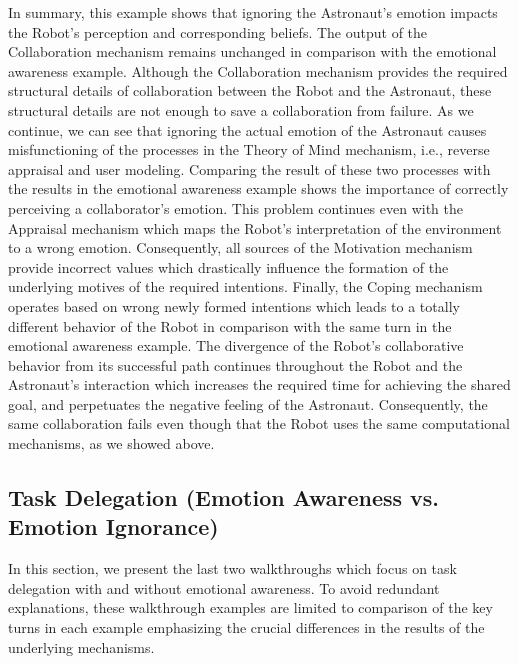 In summary, this example shows that ignoring the Astronaut's emotion impacts the
Robot's perception and corresponding beliefs. The output of the Collaboration
mechanism remains unchanged in comparison with the emotional awareness example.
Although the Collaboration mechanism provides the required structural details of
collaboration between the Robot and the Astronaut, these structural details are
not enough to save a collaboration from failure. As we continue, we can see that
ignoring the actual emotion of the Astronaut causes misfunctioning of the
processes in the Theory of Mind mechanism, i.e., reverse appraisal and user
modeling. Comparing the result of these two processes with the results in the
emotional awareness example shows the importance of correctly perceiving a
collaborator's emotion. This problem continues even with the Appraisal mechanism
which maps the Robot's interpretation of the environment to a wrong emotion.
Consequently, all sources of the Motivation mechanism provide incorrect values
which drastically influence the formation of the underlying motives of the
required intentions. Finally, the Coping mechanism operates based on wrong newly
formed intentions which leads to a totally different behavior of the Robot in
comparison with the same turn in the emotional awareness example. The divergence
of the Robot's collaborative behavior from its successful path continues
throughout the Robot and the Astronaut's interaction which increases the
required time for achieving the shared goal, and perpetuates the negative
feeling of the Astronaut. Consequently, the same collaboration fails even though
that the Robot uses the same computational mechanisms, as we showed above.

\subsection{Task Delegation (Emotion Awareness vs. Emotion Ignorance)}
\label{sec:wt-exp3}

In this section, we present the last two walkthroughs which focus on task
delegation with and without emotional awareness. To avoid redundant
explanations, these walkthrough examples are limited to comparison of the key
turns in each example emphasizing the crucial differences in the results of the
underlying mechanisms. \\

\noindent{}\\

